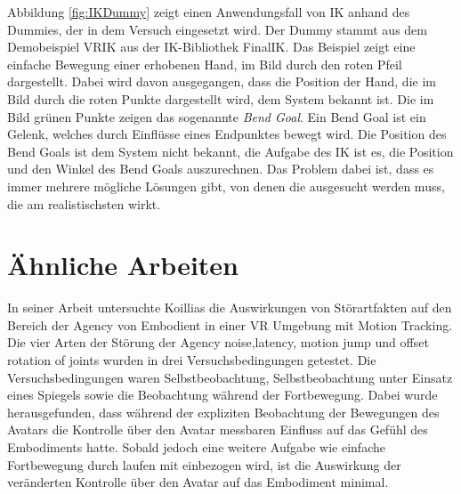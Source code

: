 Abbildung \ref{fig:IKDummy} zeigt einen Anwendungsfall von IK anhand des Dummies, der in dem Versuch eingesetzt wird. Der Dummy stammt aus dem Demobeispiel VRIK aus der IK-Bibliothek FinalIK. Das Beispiel zeigt eine einfache Bewegung einer erhobenen Hand, im Bild durch den roten Pfeil dargestellt.
Dabei wird davon ausgegangen, dass die Position der Hand, die im Bild durch die roten Punkte dargestellt wird, dem System bekannt ist. Die im Bild grünen Punkte zeigen das sogenannte \textit{Bend Goal}. Ein Bend Goal ist ein Gelenk, welches durch Einflüsse eines Endpunktes bewegt wird. Die Position des Bend Goals ist dem System nicht bekannt, die Aufgabe des IK ist es, die Position und den Winkel des Bend Goals auszurechnen. Das Problem dabei ist, dass es immer mehrere mögliche Lösungen gibt, von denen die ausgesucht werden muss, die am realistischsten wirkt.


\section{Ähnliche Arbeiten}
In seiner Arbeit untersuchte Koillias \cite{Koilias2019} die Auswirkungen von Störartfakten auf den Bereich der Agency von Embodient in einer VR Umgebung mit Motion Tracking. Die vier Arten der Störung der Agency noise,latency, motion jump und offset rotation of joints wurden in drei Versuchsbedingungen getestet. Die Versuchsbedingungen waren Selbstbeobachtung, Selbstbeobachtung unter Einsatz eines Spiegels sowie die Beobachtung während der Fortbewegung. Dabei wurde herausgefunden, dass während der expliziten Beobachtung der Bewegungen des Avatars die Kontrolle über den Avatar messbaren Einfluss auf das Gefühl des Embodiments hatte. Sobald jedoch eine weitere Aufgabe wie einfache Fortbewegung durch laufen mit einbezogen wird, ist die Auswirkung der veränderten Kontrolle über den Avatar auf das Embodiment minimal. 